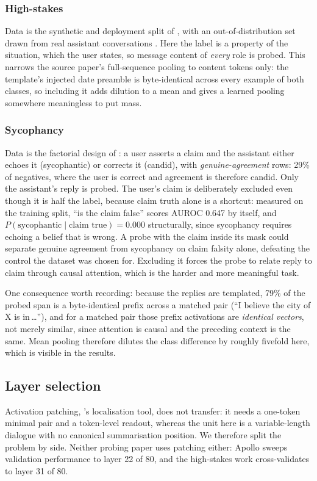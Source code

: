 \documentclass[conference]{IEEEtran}
\begin{document}
\subsubsection{High-stakes}
Data is the synthetic and deployment split of \citet{mckenzie2025}, with an
out-of-distribution set drawn from real assistant conversations
\citep{bai2022}. Here the label is a property of the situation, which the user
states, so message content of \emph{every} role is probed. This narrows the
source paper's full-sequence pooling to content tokens only: the template's
injected date preamble is byte-identical across every example of both classes,
so including it adds dilution to a mean and gives a learned pooling somewhere
meaningless to put mass.

\subsubsection{Sycophancy}
Data is the factorial design of \citet{cincynlp2025}: a user asserts a claim and
the assistant either echoes it (sycophantic) or corrects it (candid), with
\emph{genuine-agreement} rows: 29\% of negatives, where the user is correct
and agreement is therefore candid. Only the assistant's reply is probed. The
user's claim is deliberately excluded even though it is half the label, because
claim truth alone is a shortcut: measured on the training split, ``is the claim
false'' scores AUROC 0.647 by itself, and $P(\text{sycophantic} \mid \text{claim
true}) = 0.000$ structurally, since sycophancy requires echoing a belief that is
wrong. A probe with the claim inside its mask could separate genuine agreement
from sycophancy on claim falsity alone, defeating the control the dataset was
chosen for. Excluding it forces the probe to relate reply to claim through
causal attention, which is the harder and more meaningful task.

One consequence worth recording: because the replies are templated, 79\% of the
probed span is a byte-identical prefix across a matched pair (``I believe the
city of X is in\,\ldots''), and for a matched pair those prefix activations are
\emph{identical vectors}, not merely similar, since attention is causal and the
preceding context is the same. Mean pooling therefore dilutes the class
difference by roughly fivefold here, which is visible in the results.

\subsection{Layer selection}
Activation patching, \citeauthor{marks2024}'s localisation tool, does not
transfer: it needs a one-token minimal pair and a token-level readout, whereas
the unit here is a variable-length dialogue with no canonical summarisation
position. We therefore split the problem by side. Neither probing paper uses
patching either: Apollo sweeps validation performance to layer 22 of 80, and the
high-stakes work cross-validates to layer 31 of 80.
\end{document}
